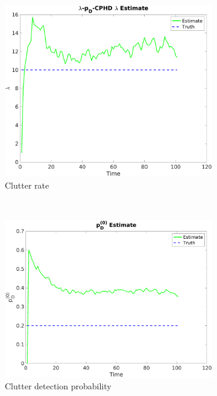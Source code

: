 \documentclass{article}
\begin{document}
\begin{figure}[H]
  \centering
  \begin{subfigure}[t]{0.32\textwidth}
    \centering
    \includegraphics[width=1\linewidth]{optimal/lpdcphd_lambda_hat.png}
    \caption{Clutter rate}
  \end{subfigure}%
  ~ 
  \begin{subfigure}[t]{0.32\textwidth}
    \centering
    \includegraphics[width=1\linewidth]{optimal/pd0_hat.png}
    \caption{Clutter detection probability}
  \end{subfigure}
  ~ 
  \begin{subfigure}[t]{0.32\textwidth}

\end{subfigure}
\end{figure}
\end{document}
